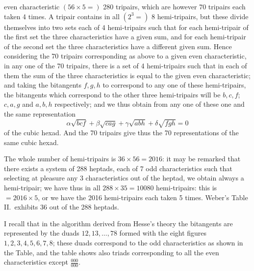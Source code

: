 \documentclass[11pt]{article}
\begin{document}
even characteristic $(56 \times 5 =)$ 280 tripairs, which are however 70 tripairs each taken 4 times. A tripair contains in all $(2^3 =)$ 8 hemi-tripairs, but these divide themselves into two sets each of 4 hemi-tripairs such that for each hemi-tripair of the first set the three characteristics have a given sum, and for each hemi-tripair of the second set the three characteristics have a different given sum. Hence considering the 70 tripairs corresponding as above to a given even characteristic, in any one of the 70 tripairs, there is a set of 4 hemi-tripairs such that in each of them the sum of the three characteristics is equal to the given even characteristic; and taking the bitangents $f, g, h$ to correspond to any one of these hemi-tripairs, the bitangents which correspond to the other three hemi-tripairs will be $b, c, f$; $c, a, g$ and $a, b, h$ respectively; and we thus obtain from any one of these one and the same representation
\[
\alpha\sqrt{bcf} + \beta\sqrt{cag} + \gamma\sqrt{abh} + \delta\sqrt{fgh} = 0
\]
of the cubic hexad. And the 70 tripairs give thus the 70 representations of the same cubic hexad.

\medskip

The whole number of hemi-tripairs is $36 \times 56 = 2016$: it may be remarked that there exists a system of 288 heptads, each of 7 odd characteristics such that selecting at pleasure any 3 characteristics out of the heptad, we obtain always a hemi-tripair; we have thus in all $288 \times 35 = 10080$ hemi-tripairs: this is $= 2016 \times 5$, or we have the 2016 hemi-tripairs each taken 5 times. Weber's Table II.\ exhibits 36 out of the 288 heptads.

\medskip

I recall that in the algorithm derived from Hesse's theory the bitangents are represented by the duads $12, 13, \ldots, 78$ formed with the eight figures $1, 2, 3, 4, 5, 6, 7, 8$; these duads correspond to the odd characteristics as shown in the Table, and the table shows also triads corresponding to all the even characteristics except $\tfrac{000}{000}$.

\medskip
\end{document}
